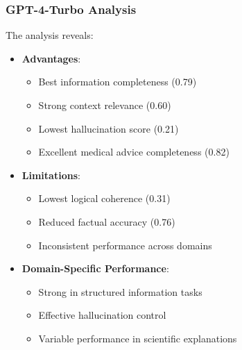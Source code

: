 \vspace{0.5em}
\subsubsection{GPT-4-Turbo Analysis}
The analysis reveals:
\begin{itemize}
    \item \textbf{Advantages}:
    \begin{itemize}
        \item Best information completeness (0.79)
        \item Strong context relevance (0.60)
        \item Lowest hallucination score (0.21)
        \item Excellent medical advice completeness (0.82)
    \end{itemize}
    \vspace{0.5em}
    \item \textbf{Limitations}:
    \begin{itemize}
        \item Lowest logical coherence (0.31)
        \item Reduced factual accuracy (0.76)
        \item Inconsistent performance across domains
    \end{itemize}
    \vspace{0.5em}
    \item \textbf{Domain-Specific Performance}:
    \begin{itemize}
        \item Strong in structured information tasks
        \item Effective hallucination control
        \item Variable performance in scientific explanations
    \end{itemize}
\end{itemize}

\vspace{0.5em}
